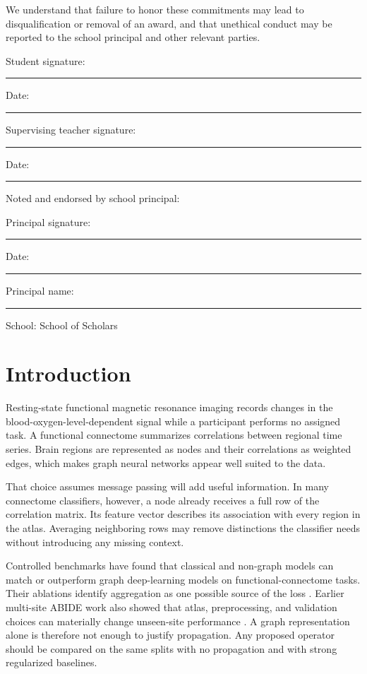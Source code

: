 \documentclass[11pt,a4paper]{article}
\begin{document}
We understand that failure to honor these commitments may lead to
disqualification or removal of an award, and that unethical conduct may be
reported to the school principal and other relevant parties.

\vspace{0.25cm}
\noindent Student signature: \rule{7.2cm}{0.4pt}\hfill Date: \rule{3.0cm}{0.4pt}

\vspace{0.25cm}
\noindent Supervising teacher signature: \rule{5.5cm}{0.4pt}\hfill Date: \rule{3.0cm}{0.4pt}

\vspace{0.25cm}
\noindent Noted and endorsed by school principal:

\vspace{0.25cm}
\noindent Principal signature: \rule{7.0cm}{0.4pt}\hfill Date: \rule{3.0cm}{0.4pt}

\vspace{0.15cm}
\noindent Principal name: \rule{7.2cm}{0.4pt}\hfill School: School of Scholars
\normalsize

\clearpage
\tableofcontents
\clearpage

\setcounter{page}{1}

\section{Introduction}

Resting-state functional magnetic resonance imaging records changes in the
blood-oxygen-level-dependent signal while a participant performs no assigned
task. A functional connectome summarizes correlations between regional time
series. Brain regions are represented as nodes and their correlations as
weighted edges, which makes graph neural networks appear well suited to the
data.

That choice assumes message passing will add useful information. In many
connectome classifiers, however, a node already receives a full row of the
correlation matrix. Its feature vector describes its association with every
region in the atlas. Averaging neighboring rows may remove distinctions the
classifier needs without introducing any missing context.

Controlled benchmarks have found that classical and non-graph models can
match or outperform graph deep-learning models on functional-connectome
tasks. Their ablations identify aggregation as one possible source of the loss
\cite{han2026rethinking}. Earlier multi-site ABIDE work also showed that atlas,
preprocessing, and validation choices can materially change unseen-site
performance \cite{abraham2017reproducible}. A graph representation alone is therefore not enough
to justify propagation. Any proposed operator should be compared on the same
splits with no propagation and with strong regularized baselines.
\end{document}
